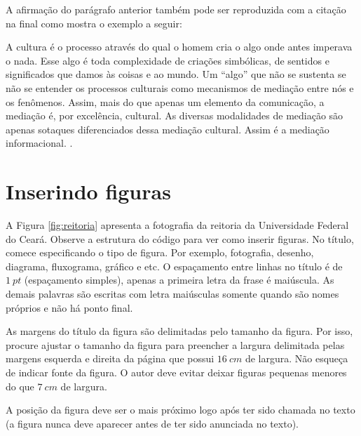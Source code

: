     A afirmação do parágrafo anterior também pode ser reproduzida com a citação na final como mostra o exemplo a seguir: 
    \begin{citacao}
        A cultura é o processo através do qual o homem cria o algo onde antes imperava o nada. Esse algo é toda complexidade de criações simbólicas, de sentidos e significados que damos às coisas e ao mundo. Um “algo” que não se sustenta se não se entender os processos culturais como mecanismos de mediação entre nós e os fenômenos. Assim, mais do que apenas um elemento da comunicação, a mediação é, por excelência, cultural. As diversas modalidades de mediação são apenas sotaques diferenciados dessa mediação cultural. Assim é a mediação informacional. \cite{feitosa2016}.
    \end{citacao}
        

\section{Inserindo figuras}\label{sec:figuras}
    
    A Figura \ref{fig:reitoria} apresenta a fotografia da reitoria da Universidade Federal do Ceará. Observe a estrutura do código para ver como inserir figuras. No título, comece especificando o tipo de figura. Por exemplo, fotografia, desenho, diagrama, fluxograma, gráfico e etc. O espaçamento entre linhas no título é de $1~pt$ (espaçamento simples), apenas a primeira letra da frase é maiúscula. As demais palavras são escritas com letra maiúsculas somente quando são nomes próprios e não há ponto final. 
    
    As margens do título da figura são delimitadas pelo tamanho da figura. Por isso, procure ajustar o tamanho da figura para preencher a largura delimitada pelas margens esquerda e direita da página que possui $16~cm$ de largura. Não esqueça de indicar fonte da figura. O autor deve evitar deixar figuras pequenas menores do que $7~cm$ de largura.
    
    A posição da figura deve ser o mais próximo logo após ter sido chamada no texto (a figura nunca deve aparecer antes de ter sido anunciada no texto). 
    
